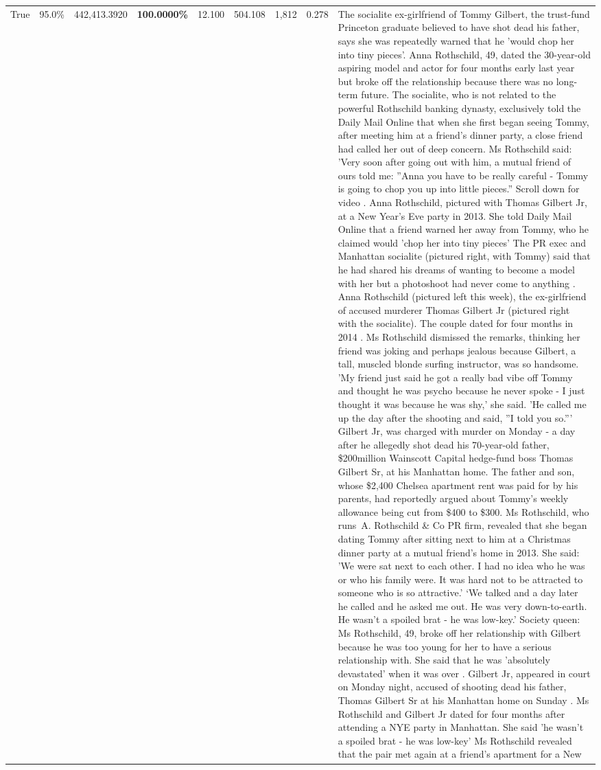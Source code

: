 \begin{table}[H]
\begin{tabular}{lllrlllll}
True & 95.0\% & 442,413.3920 & \bfseries \color{red} 100.0000\% & 12.100 & 504.108 & 1,812 & 0.278 & The socialite ex-girlfriend of Tommy Gilbert, the trust-fund Princeton graduate believed to have shot dead his father, says she was repeatedly warned that he 'would chop her into tiny pieces'. Anna Rothschild, 49, dated the 30-year-old aspiring model and actor for four months early last year but broke off the relationship because there was no long-term future. The socialite, who is not related to the powerful Rothschild banking dynasty, exclusively told the Daily Mail Online that when she first began seeing Tommy, after meeting him at a friend's dinner party, a close friend had called her out of deep concern. Ms Rothschild said: 'Very soon after going out with him, a mutual friend of ours told me: ''Anna you have to be really careful - Tommy is going to chop you up into little pieces.'' Scroll down for video . Anna Rothschild, pictured with Thomas Gilbert Jr, at a New Year's Eve party in 2013. She told Daily Mail Online that a friend warned her away from Tommy, who he claimed would 'chop her into tiny pieces' The PR exec and Manhattan socialite (pictured right, with Tommy) said that he had shared his dreams of wanting to become a model with her but a photoshoot had never come to anything . Anna Rothschild (pictured left this week), the ex-girlfriend of accused murderer Thomas Gilbert Jr (pictured right with the socialite). The couple dated for four months in 2014 . Ms Rothschild dismissed the remarks, thinking her friend was joking and perhaps jealous because Gilbert, a tall, muscled blonde surfing instructor, was so handsome. 'My friend just said he got a really bad vibe off Tommy and thought he was psycho because he never spoke - I just thought it was because he was shy,' she said. 'He called me up the day after the shooting and said, ''I told you so.''' Gilbert Jr, was charged with murder on Monday - a day after he allegedly shot dead his 70-year-old father, \$200million Wainscott Capital hedge-fund boss Thomas Gilbert Sr, at his Manhattan home. The father and son, whose \$2,400 Chelsea apartment rent was paid for by his parents, had reportedly argued about Tommy's weekly allowance being cut from \$400 to \$300. Ms Rothschild, who runs A. Rothschild \& Co PR firm, revealed that she began dating Tommy after sitting next to him at a Christmas dinner party at a mutual friend's home in 2013. She said: 'We were sat next to each other. I had no idea who he was or who his family were. It was hard not to be attracted to someone who is so attractive.' ‘We talked and a day later he called and he asked me out. He was very down-to-earth. He wasn’t a spoiled brat - he was low-key.’ Society queen: Ms Rothschild, 49, broke off her relationship with Gilbert because he was too young for her to have a serious relationship with. She said that he was 'absolutely devastated' when it was over . Gilbert Jr, appeared in court on Monday night, accused of shooting dead his father, Thomas Gilbert Sr at his Manhattan home on Sunday . Ms Rothschild and Gilbert Jr dated for four months after attending a NYE party in Manhattan. She said 'he wasn't a spoiled brat - he was low-key' Ms Rothschild revealed that the pair met again at a friend’s apartment for a New 
\end{tabular}
\end{table}
